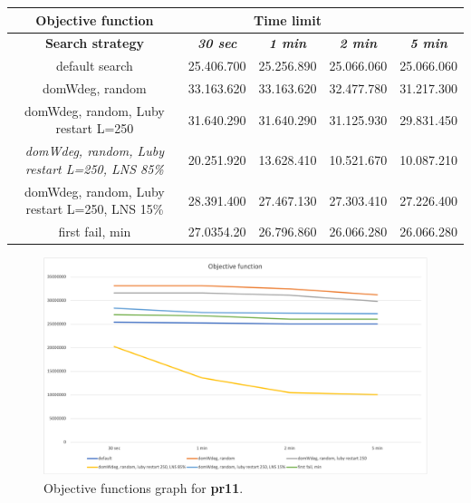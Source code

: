 {
\renewcommand{\arraystretch}{2}
\begin{longtable}[h]{| c | c | c | c | c |}
    \hline
    \textbf{Objective function} & \multicolumn{3}{c}{Time limit} & \\
    \hline
    \textbf{Search strategy} & \textbf{\textit{30 sec}} & \textbf{\textit{1 min}} & \textbf{\textit{2 min}} & \textbf{\textit{5 min}} \\
    \hline
    \endhead
    default search                                         & 25.406.700 & 25.256.890 & 25.066.060 & 25.066.060 \\
    \hline
    domWdeg, random                                        & 33.163.620 & 33.163.620 & 32.477.780 & 31.217.300 \\
    \hline
    domWdeg, random, Luby restart L=250                    & 31.640.290 & 31.640.290 & 31.125.930 & 29.831.450 \\
    \hline
    \textit{domWdeg, random, Luby restart L=250, LNS 85\%} & 20.251.920 & 13.628.410 & 10.521.670 & 10.087.210 \\
    \hline
    domWdeg, random, Luby restart L=250, LNS 15\%          & 28.391.400 & 27.467.130 & 27.303.410 & 27.226.400 \\
    \hline
    first fail, min                                        & 27.0354.20 & 26.796.860 & 26.066.280 & 26.066.280 \\
    \hline
\end{longtable}
}
\begin{figure}[H]
    \centering
    \includegraphics[width=0.8\columnwidth]{../graphs/pr11-objf.png}
    \caption{Objective functions graph for \textbf{pr11}.}
\end{figure}

